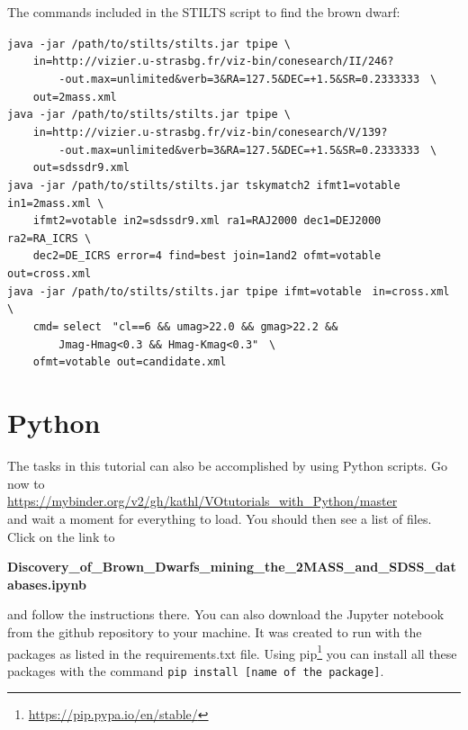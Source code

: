 \documentclass [a4paper, 12pt]{article}
\begin{document}
The commands included in the STILTS script to find the brown dwarf:\\
\begin{small}
\noindent\verb|java -jar /path/to/stilts/stilts.jar tpipe \| \\
\verb|    |
\textquotesingle
\verb|in=http://vizier.u-strasbg.fr/viz-bin/conesearch/II/246?| \\
\verb|        -out.max=unlimited&verb=3&RA=127.5&DEC=+1.5&SR=0.2333333|
\textquotesingle
\verb| \|\\
\verb|    out=2mass.xml| \\

\noindent\verb|java -jar /path/to/stilts/stilts.jar tpipe \| \\
\verb|    |
\textquotesingle
\verb|in=http://vizier.u-strasbg.fr/viz-bin/conesearch/V/139?| \\
\verb|        -out.max=unlimited&verb=3&RA=127.5&DEC=+1.5&SR=0.2333333|
\textquotesingle
\verb| \| \\
\verb|    out=sdssdr9.xml| \\

\noindent\verb|java -jar /path/to/stilts/stilts.jar tskymatch2 ifmt1=votable |
\verb|in1=2mass.xml \| \\
\verb|    ifmt2=votable in2=sdssdr9.xml ra1=RAJ2000 dec1=DEJ2000 |
\verb|ra2=RA_ICRS \| \\
\verb|    dec2=DE_ICRS error=4 find=best join=1and2 ofmt=votable |
\verb|out=cross.xml| \\

\noindent\verb|java -jar /path/to/stilts/stilts.jar tpipe ifmt=votable | 
\verb|in=cross.xml \| \\
\verb|    cmd=|\textquotesingle
\verb|select |
\verb|"cl==6 && umag>22.0 && gmag>22.2 && |\\
\verb|        Jmag-Hmag<0.3 && Hmag-Kmag<0.3"|
\textquotesingle
\verb| \| \\
\verb|    ofmt=votable out=candidate.xml| \\
\end{small}


\section{Python}
The tasks in this tutorial can also be accomplished by using Python scripts. 
Go now to \\
\url{https://mybinder.org/v2/gh/kathl/VOtutorials_with_Python/master}\\
and wait a moment for everything to load. You should then see a list of files. 
Click on the link to 

\textbf{Discovery\_of\_Brown\_Dwarfs\_mining\_the\_2MASS\_and\_SDSS\_databases.ipynb}

\noindent and follow the instructions there. You can also download the Jupyter 
notebook from the github repository to your 
machine. It was created to run with the packages as listed in the 
requirements.txt file. Using pip\footnote{\url{https://pip.pypa.io/en/stable/}} 
you can install all these packages with the command \texttt{pip install [name 
    of the package]}. 
%
\end{document}

